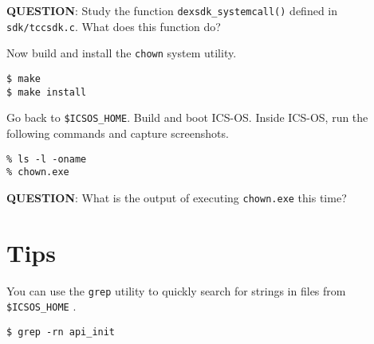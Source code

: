 \documentclass[a4paper, 11pt,oneside]{article}
\begin{document}
\textbf{QUESTION}: Study the function \texttt{dexsdk\_systemcall()} defined in \texttt{sdk/tccsdk.c}.
What does this function do?

Now build and install the \texttt{chown} system utility.
\begin{Verbatim}[frame=single]
$ make
$ make install
\end{Verbatim}

Go back to \texttt{\$ICSOS\_HOME}. Build and boot ICS-OS. 
Inside ICS-OS, run the following commands and capture screenshots.

\begin{Verbatim}[frame=single]
% cd apps
% ls -l -oname
% chown.exe
\end{Verbatim}

\textbf{QUESTION}: What is the output of executing \texttt{chown.exe} this time?


\section{Tips}
You can use the \texttt{grep} utility to quickly search for strings in files from \texttt{\$ICSOS\_HOME} .
\begin{Verbatim}[frame=single]
$ grep -rn api_init
\end{Verbatim}
 
\end{document}
